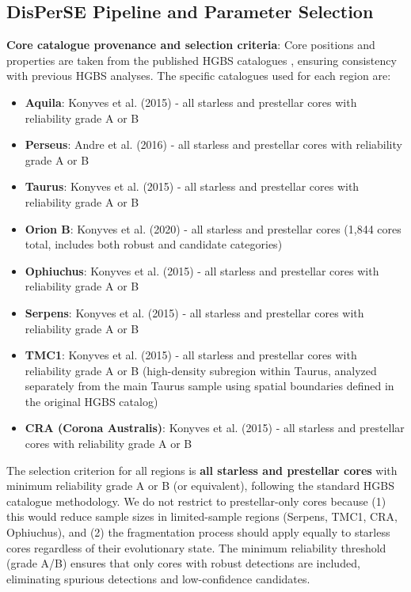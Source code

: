 \documentclass[11pt,a4paper]{article}
\begin{document}
\subsection{DisPerSE Pipeline and Parameter Selection}

\textbf{Core catalogue provenance and selection criteria}: Core positions and properties are taken from the published HGBS catalogues \citep{Konyves2015, Konyves2020, Andre2016}, ensuring consistency with previous HGBS analyses. The specific catalogues used for each region are:
\begin{itemize}
    \item \textbf{Aquila}: Konyves et al. (2015) - all starless and prestellar cores with reliability grade A or B
    \item \textbf{Perseus}: Andre et al. (2016) - all starless and prestellar cores with reliability grade A or B
    \item \textbf{Taurus}: Konyves et al. (2015) - all starless and prestellar cores with reliability grade A or B
    \item \textbf{Orion B}: Konyves et al. (2020) - all starless and prestellar cores (1,844 cores total, includes both robust and candidate categories)
    \item \textbf{Ophiuchus}: Konyves et al. (2015) - all starless and prestellar cores with reliability grade A or B
    \item \textbf{Serpens}: Konyves et al. (2015) - all starless and prestellar cores with reliability grade A or B
    \item \textbf{TMC1}: Konyves et al. (2015) - all starless and prestellar cores with reliability grade A or B (high-density subregion within Taurus, analyzed separately from the main Taurus sample using spatial boundaries defined in the original HGBS catalog)
    \item \textbf{CRA (Corona Australis)}: Konyves et al. (2015) - all starless and prestellar cores with reliability grade A or B
\end{itemize}
The selection criterion for all regions is \textbf{all starless and prestellar cores} with minimum reliability grade A or B (or equivalent), following the standard HGBS catalogue methodology. We do not restrict to prestellar-only cores because (1) this would reduce sample sizes in limited-sample regions (Serpens, TMC1, CRA, Ophiuchus), and (2) the fragmentation process should apply equally to starless cores regardless of their evolutionary state. The minimum reliability threshold (grade A/B) ensures that only cores with robust detections are included, eliminating spurious detections and low-confidence candidates.
\end{document}
